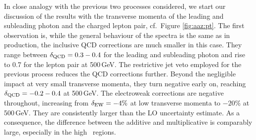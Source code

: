 In close analogy with the previous two processes considered, 
we start our discussion of the results with the transverse 
momenta of the leading and subleading photon and the charged 
lepton pair, cf.\ Figure \ref{fig:aaz:pt}. 
The first observation is, while the general behaviour of the 
spectra is the same as in \aaw production, the inclusive QCD 
corrections are much smaller in this case. 
They range between $\delta_\text{QCD}=0.3-0.4$ for the leading and 
subleading photon and rise to 0.7 for the lepton pair at 
500\,GeV. 
The restrictive jet veto employed for the previous process 
reduces the QCD corrections further. 
Beyond the negligible impact at very small transverse 
momenta, they turn negative early on, reaching $\delta_\text{QCD}=-0.2-0.4$ 
at 500\,GeV. 
The electroweak corrections are negative throughout, increasing 
from $\delta_\text{EW}=-4\%$ at low transverse momenta to $-20\%$ at 
500\,GeV.
They are consistently larger than the LO uncertainty estimate. 
As a consequence, the difference between the additive and 
multiplicative is comparably large, especially in the high 
\pT\ regions. 

